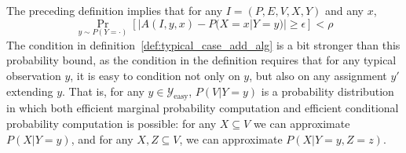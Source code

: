 \documentclass{article}
\theoremstyle{definition}
\newtheorem{defn}{Definition}
\theoremstyle{remark}
\begin{document}
The preceding definition implies that for any $I = (P, E, V, X, Y)$ and any $x$,
$$
\Pr_{y \sim P(Y = \cdot)}[|A(I, y, x) - P(X = x | Y = y)| \geq \epsilon] < \rho
$$
The condition in definition~\ref{def:typical_case_add_alg} is a bit stronger than this probability bound, as the condition in the definition requires that for any typical observation $y$, it is easy to condition not only on $y$, but also on any assignment $y'$ extending $y$.
That is, for any $y \in \mathcal{Y}_\text{easy}$, $P(V | Y = y)$ is a probability distribution in which both efficient marginal probability computation and efficient conditional probability computation is possible: for any $X \subseteq V$ we can approximate $P(X | Y = y)$, and for any $X, Z \subseteq V$, we can approximate $P(X | Y = y, Z = z)$.



\end{document}
